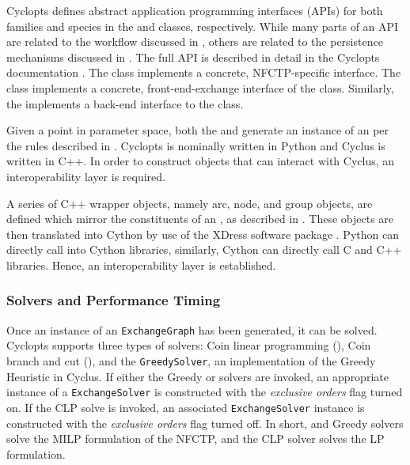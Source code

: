 Cyclopts defines abstract application programming interfaces (APIs) for both
families and species in the  and 
classes, respectively. While many parts of an API are related to the workflow
discussed in , others are related to the persistence
mechanisms discussed in . The full API is described in
detail in the Cyclopts documentation \cite{cyclopts}. The 
class implements a concrete, NFCTP-specific  interface. The
 class implements a concrete, front-end-exchange
interface of the  class. Similarly, the
 implements a back-end interface to the class.

Given a point in parameter space, both the  and
 generate an instance of an  per the
rules described in . Cyclopts is nominally written in
Python and Cyclus is written in C++. In order to construct objects that can
interact with Cyclus, an interoperability layer is required. 

A series of C++ wrapper objects, namely arc, node, and group objects, are
defined which mirror the constituents of an , as described
in . These objects are then translated into Cython
\cite{behnel2010cython} by use of the XDress software package
\cite{xdress}. Python can directly call into Cython libraries, similarly, Cython
can directly call C and C++ libraries. Hence, an interoperability layer is
established.

\subsubsection{Solvers and Performance Timing}

Once an instance of an \texttt{ExchangeGraph} has been generated, it can be
solved. Cyclopts supports three types of solvers: Coin linear programming
(\clp), Coin branch and cut (\cbc), and the \texttt{GreedySolver}, an
implementation of the Greedy Heuristic in Cyclus. If either the Greedy or \cbc
solvers are invoked, an appropriate instance of a \texttt{ExchangeSolver} is
constructed with the \textit{exclusive orders} flag turned on. If the CLP solve
is invoked, an associated \texttt{ExchangeSolver} instance is constructed with
the \textit{exclusive orders} flag turned off. In short, \cbc and Greedy solvers
solve the MILP formulation of the NFCTP, and the CLP solver solves the LP
formulation.

